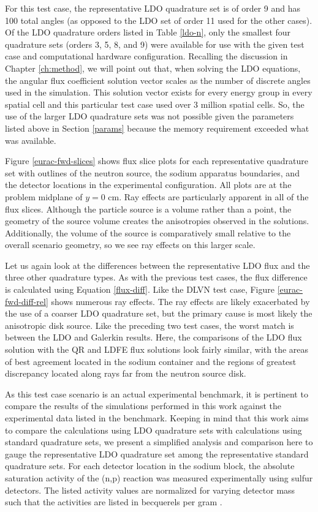 For this test case, the
representative LDO quadrature set is of order 9 and has 100 total angles (as opposed
to the LDO set of order 11 used for the other cases). Of the LDO quadrature orders
listed in Table \ref{ldo-n}, only the smallest four quadrature sets (orders 3, 5, 8,
and 9) were available for use with the given test case and computational hardware 
configuration. Recalling the discussion in Chapter \ref{ch:method}, we will point out
that, when solving the LDO equations, the angular flux coefficient solution vector
scales as the number of discrete angles used in the simulation. This solution vector 
exists for every energy group in every spatial cell and this particular test case used
over 3 million spatial cells. So, the use of the larger LDO quadrature sets was not 
possible given the parameters listed above in Section \ref{params} because the memory
requirement exceeded what was available.

Figure \ref{eurac-fwd-slices} shows flux slice plots for each representative
quadrature set with outlines of the neutron source, the sodium apparatus boundaries,
and the detector locations in the experimental configuration. All plots are at the problem
midplane of $y = 0$ cm.
Ray effects are particularly apparent in all of the flux slices. Although the
particle source is a volume rather than a point,
the geometry of the source volume creates the anisotropies observed in the solutions.
Additionally, the volume of the source is comparatively small relative to the overall
scenario geometry, so we see ray effects on this larger scale.

Let us again look at the differences between the representative LDO flux and the three
other quadrature types. As with the previous test cases, the flux difference is
calculated using Equation \ref{flux-diff}. Like the DLVN test case, Figure
\ref{eurac-fwd-diff-rel} shows numerous ray effects. The ray effects are likely
exacerbated by the use of a coarser LDO quadrature set, but the primary cause is most 
likely the anisotropic disk source. Like the preceding two test cases, the worst match
is between the LDO and Galerkin results. Here, the comparisons of the LDO flux 
solution with the QR and LDFE flux solutions look fairly similar, with the areas of
best agreement located in the sodium container and the regions of greatest 
discrepancy located along rays far from the neutron source disk.

As this test case scenario is an actual experimental benchmark, it is pertinent to
compare the results of the simulations performed in this work against the experimental
data listed in the benchmark. Keeping in mind that this work aims to compare the
calculations using LDO quadrature sets with calculations using standard quadrature
sets, we present a simplified analysis and comparison here to gauge the representative
LDO quadrature set among the representative standard quadrature sets. For each 
detector location in the sodium block, the absolute saturation activity of the 
(n,p) reaction was measured experimentally using sulfur 
detectors. The listed activity values are normalized for varying detector mass such 
that the activities are listed in becquerels per gram \cite{eurac}.

